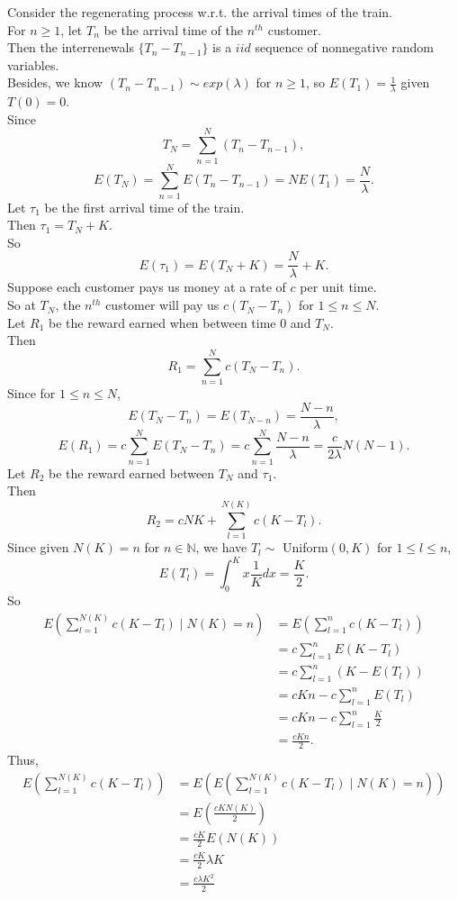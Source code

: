 \documentclass{extarticle}
\newcommand{\bbn}{\mathbb{N}}
\theoremstyle{plain}
\theoremstyle{definition}
\begin{document}
\noindent {}
Consider the regenerating process w.r.t. the arrival times of the train.\\
For $n \geq 1$, let $T_n$ be the arrival time of the $n^{th}$ customer.\\
Then the interrenewals $\{T_{n}-T_{n-1}\}$ is a $iid$ sequence of nonnegative random variables.\\ 
Besides, we know $\left(T_{n}-T_{n-1}\right) \sim exp(\lambda)$ for $n \geq 1$, so $E(T_1) = \frac{1}{\lambda}$ given $T(0)= 0$.\\
Since 
\[T_N = \sum_{n=1}^N \left(T_{n}-T_{n-1}\right),\]
\[E(T_N) = \sum_{n=1}^NE\left(T_{n}-T_{n-1}\right) = NE(T_{1}) = \frac{N}{\lambda}.\] 
Let $\tau_1$ be the first arrival time of the train.\\
Then $\tau_1 = T_N + K$. \\
So \[ E(\tau_1) = E(T_N + K) = \frac{N}{\lambda}  + K. \]
Suppose each customer pays us money at a rate of $c$ per unit time.\\
So at $T_N$, the $n^{th}$ customer will pay us $c(T_N-T_n)$ for $1 \leq n \leq N$.\\
Let $R_1$ be the reward earned when between time 0 and $T_N$.\\
Then 
\[R_1 = \sum_{n=1}^{N}c(T_N-T_n).\]
Since for $1 \leq n \leq N$,
\[ E(T_N-T_n)  = E(T_{N-n}) = \frac{N-n}{\lambda},\]
\[E(R_1) = c\sum_{n=1}^{N}E(T_N-T_n) = c\sum_{n=1}^N \frac{N-n}{\lambda} = \frac{c}{2\lambda}N(N-1).\]
Let $R_2$ be the reward earned between $T_N$ and $\tau_1$.\\
Then 
\[R_2 = cNK + \sum_{l=1}^{N(K)}c(K-T_l).\]
Since given $N(K) = n$ for $n \in \bbn$, we have $T_{l} \sim $ Uniform$(0, K)$ for $1 \leq l \leq n$,\\
\[E\left(T_l\right) = \int_{0}^K x \frac{1}{K} dx = \frac{K}{2}.\]
So
\begin{align*}
	E\left(\sum_{l=1}^{N(K)}c(K-T_l) \mid N(K) =n \right) &= E\left(\sum_{l=1}^{n}c(K-T_l) \right) \\
  								&= c\sum_{l=1}^nE(K-T_l) \\
  								&= c\sum_{l=1}^n\left(K-E(T_l)\right)\\
  								&= cKn-c\sum_{l=1}^nE(T_l) \\
  								& = cKn-c\sum_{l=1}^n \frac{K}{2} \\
  								&= \frac{cKn}{2}.
\end{align*}
Thus,
\begin{align*}
  E\left(\sum_{l=1}^{N(K)}c(K-T_l)\right) &= E\left( E\left(\sum_{l=1}^{N(K)}c(K-T_l) \mid N(K) =n \right)\right)\\
  										&= E\left(\frac{cKN(K)}{2} \right)\\
 			 							&= \frac{cK}{2}E\left(N(K)\right) \\
  										&= \frac{cK}{2} \lambda K \\
  									    &= \frac{c\lambda K^2}{2}
\end{align*}
\end{document}
